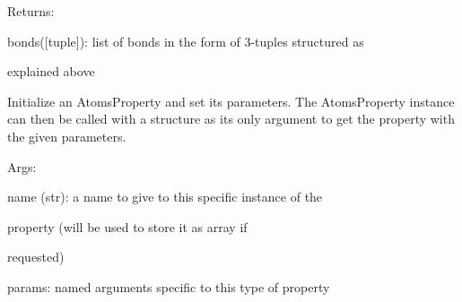 \documentclass[letterpaper,10pt,english]{sphinxmanual}
\begin{document}
\begin{fulllineitems}
\begin{DUlineblock}{0em}
\item[] Returns:
\item[]
\begin{DUlineblock}{\DUlineblockindent}
\item[] bonds({[}tuple{]}): list of bonds in the form of 3-tuples structured as
\item[]
\begin{DUlineblock}{\DUlineblockindent}
\item[] explained above
\end{DUlineblock}
\end{DUlineblock}
\end{DUlineblock}

Initialize an AtomsProperty and set its parameters.
The AtomsProperty instance can then be called with a structure as its
only argument to get the property with the given parameters.

\begin{DUlineblock}{0em}
\item[] Args:
\item[]
\begin{DUlineblock}{\DUlineblockindent}
\item[] name (str): a name to give to this specific instance of the
\item[]
\begin{DUlineblock}{\DUlineblockindent}
\item[] property (will be used to store it as array if
\item[] requested)
\end{DUlineblock}
\item[] params: named arguments specific to this type of property
\end{DUlineblock}
\end{DUlineblock}

\begin{fulllineitems}
\label{doctree/soprano.properties.linkage.linkage:soprano.properties.linkage.linkage.Bonds.default_name}
\end{fulllineitems}


\begin{fulllineitems}
\label{doctree/soprano.properties.linkage.linkage:soprano.properties.linkage.linkage.Bonds.default_params}
\end{fulllineitems}


\end{fulllineitems}
\end{document}
